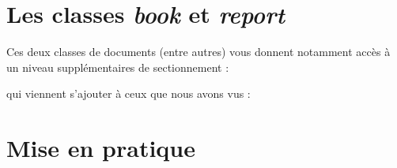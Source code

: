 \section{Les classes \emph{book} et \emph{report}}

Ces deux classes de documents (entre autres) vous donnent notamment
accès à un niveau supplémentaires de sectionnement :


qui viennent s'ajouter à ceux que nous avons vus :



\section{Mise en pratique}

